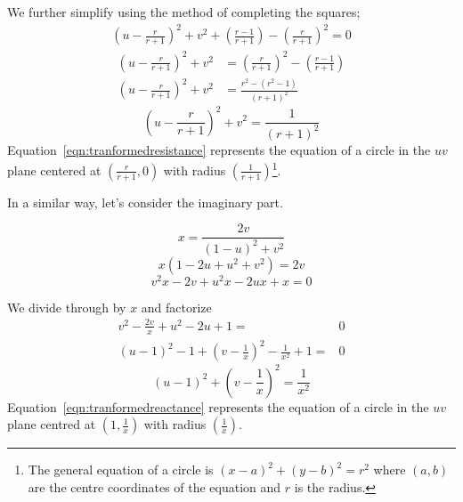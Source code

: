 We further simplify using the method of completing the squares;
\begin{align*}
{\left(u - \frac{r}{r+1}\right)}^2 + v^2 + \left(\frac{r-1}{r+1}\right) - {\left(\frac{r}{r+1}\right)}^2 = 0
\end{align*}
\begin{align*}
{\left(u - \frac{r}{r + 1}\right)}^2 + v^2 &= {\left(\frac{r}{r + 1}\right)}^2 - \left(\frac{r - 1}{r + 1}\right)\\
{\left(u - \frac{r}{r + 1}\right)}^2+ v^2 &= \frac{r^2 -(r^2 -1)}{{(r + 1)}^2}
\end{align*}
\begin{equation}
{\left(u - \frac{r}{r + 1}\right)}^2+ v^2 = \frac{1}{{(r + 1)}^2}\label{eqn:tranformedresistance}
\end{equation}
Equation~\eqref{eqn:tranformedresistance} represents the equation of a circle in the $uv$ plane centered at $\left(\frac{r}{r + 1}, 0\right) $ with radius $\left(\frac{1}{r + 1}\right)$\footnote{
The general equation of a circle is ${(x - a)}^2 + {(y - b)}^2 = r^2$ where $(a, b)$ are the centre coordinates of the equation and $r$ is the radius.
}.

In a similar way, let's consider the imaginary part.

\begin{equation*}
x = \frac{2v}{{(1 - u)}^2 + v^2}
\end{equation*}
\begin{equation*}
x(1 - 2u + u^2 + v^2) = 2v
\end{equation*}
\begin{equation*}
v^2x - 2v + u^2x - 2ux + x = 0
\end{equation*}


We divide through by $x$ and factorize
\begin{align*}
v^2 - \frac{2v}{x} +u^2 - 2u + 1 =& 0\\
{(u - 1)}^2 -1 + {\left(v - \frac{1}{x}\right)}^2 -\frac{1}{x^2} + 1 =& 0
\end{align*}
\begin{equation}
{(u - 1)}^2 + {\left(v - \frac{1}{x}\right)}^2 = \frac{1}{x^2}\label{eqn:tranformedreactance}
\end{equation}
Equation~\eqref{eqn:tranformedreactance} represents the equation of a circle in the $uv$ plane centred at $\left(1,\frac{1}{x}\right)$ with radius $\left(\frac{1}{x}\right)$.

